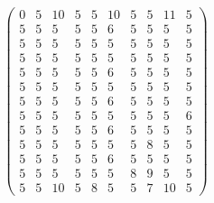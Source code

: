 \documentclass[12pt,oneside,a4paper]{article}
\begin{document}
  \begin{equation}
    \begin{pmatrix} 0 & 5 & 10 & 5 & 5 & 10 & 5 & 5 & 11 & 5 \\
                    5 & 5 & 5 & 5 & 5 & 6 & 5 & 5 & 5 & 5 \\
                    5 & 5 & 5 & 5 & 5 & 5 & 5 & 5 & 5 & 5\\
                    5 & 5 & 5 & 5 & 5 & 5 & 5 & 5 & 5 & 5 \\
                    5 & 5 & 5 & 5 & 5 & 6 & 5 & 5 & 5 & 5 \\
                    5 & 5 & 5 & 5 & 5 & 5 & 5 & 5 & 5 & 5\\
                    5 & 5 & 5 & 5 & 5 & 6 & 5 & 5 & 5 & 5 \\
                    5 & 5 & 5 & 5 & 5 & 5 & 5 & 5 & 5 & 6\\
                    5 & 5 & 5 & 5 & 5 & 6 & 5 & 5 & 5 & 5 \\
                    5 & 5 & 5 & 5 & 5 & 5 & 5 & 8 & 5 & 5\\
                    5 & 5 & 5 & 5 & 5 & 6 & 5 & 5 & 5 & 5 \\
                    5 & 5 & 5 & 5 & 5 & 5 & 8 & 9 & 5 & 5\\
                    5 & 5 & 10 & 5 & 8 & 5 & 5 & 7 & 10 & 5
    \end{pmatrix}
  \end{equation}
\end{document}
